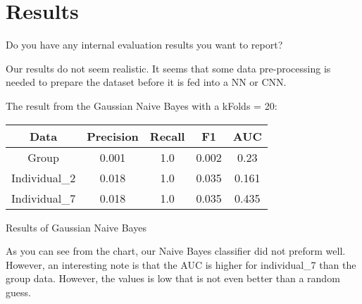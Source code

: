 \documentclass[11pt,a4paper]{article}
\begin{document}
\section{Results}
Do you have any internal evaluation results you want to report?


Our results do not seem realistic.
It seems that some data pre-processing is needed to prepare the dataset before it is fed into a NN or CNN.

The result from the Gaussian Naive Bayes with a kFolds = 20:
\begin{center}
    \begin{tabular}{||c || c c c c||}
        \hline
        Data & Precision & Recall & F1 & AUC \\ [0.5ex] 
        \hline\hline
        Group & 0.001 & 1.0 & 0.002 & 0.23 \\ 
        \hline
        Individual\_2 & 0.018 & 1.0 & 0.035 & 0.161 \\
        \hline
        Individual\_7 & 0.018 & 1.0 & 0.035 & 0.435 \\
        \hline
    \end{tabular}\par
    \bigskip
    Results of Gaussian Naive Bayes
\end{center}
As you can see from the chart, our Naive Bayes classifier did not preform well.
However, an interesting note is that the AUC is higher for individual\_7 than the group data.
However, the values is low that is not even better than a random guess.
\end{document}
